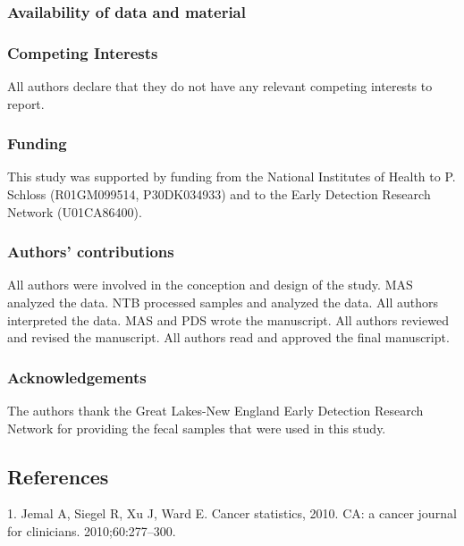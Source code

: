 \documentclass[12pt,]{article}
\begin{document}
\subsubsection{Availability of data and
material}\label{availability-of-data-and-material}

\subsubsection{Competing Interests}\label{competing-interests}

All authors declare that they do not have any relevant competing
interests to report.

\subsubsection{Funding}\label{funding}

This study was supported by funding from the National Institutes of
Health to P. Schloss (R01GM099514, P30DK034933) and to the Early
Detection Research Network (U01CA86400).

\subsubsection{Authors' contributions}\label{authors-contributions}

All authors were involved in the conception and design of the study. MAS
analyzed the data. NTB processed samples and analyzed the data. All
authors interpreted the data. MAS and PDS wrote the manuscript. All
authors reviewed and revised the manuscript. All authors read and
approved the final manuscript.

\subsubsection{Acknowledgements}\label{acknowledgements}

The authors thank the Great Lakes-New England Early Detection Research
Network for providing the fecal samples that were used in this study.

\newpage

\subsection*{References}\label{references}

\hypertarget{refs}{}
\hypertarget{ref-jemal_cancer_2010}{}
1. Jemal A, Siegel R, Xu J, Ward E. Cancer statistics, 2010. CA: a
cancer journal for clinicians. 2010;60:277--300.
\end{document}
